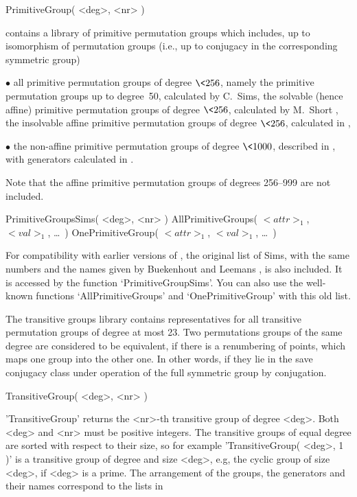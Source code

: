 
\>PrimitiveGroup( <deg>, <nr> )

{\GAP} contains a library of primitive permutation groups which includes,
up to  isomorphism of permutation groups   (i.e., up to conjugacy  in the
corresponding symmetric group)
{\parindent\manindent
\item{$\bullet$} all   primitive permutation  groups  of  degree $\<256$,
  namely
\itemitem{$\circ$}  the  primitive permutation  groups   up to degree~50,
  calculated by C.~Sims,
\itemitem{$\circ$}  the  solvable (hence  affine)   primitive permutation
  groups of degree $\<256$, calculated by M.~Short \cite{Short92},
\itemitem{$\circ$} the insolvable affine  primitive permutation groups of
  degree $\<256$, calculated in \cite{Theissen97},
\item{$\bullet$} the non-affine primitive   permutation groups of  degree
  $\<1000$,  described   in   \cite{DixonMortimer88},  with    generators
  calculated in \cite{Theissen97}.\par}
Note that the affine primitive permutation groups of degrees 256--999 are
not included.

\>PrimitiveGroupsSims( <deg>, <nr> )
\>AllPrimitiveGroups( $<attr>_1$, $<val>_1$, \dots\ )
\>OnePrimitiveGroup( $<attr>_1$, $<val>_1$, \dots\ )

For compatibility  with earlier versions  of {\GAP}, the original list of
Sims,  with  the same numbers  and  the  names  given by  Buekenhout  and
Leemans \cite{BuekenhoutLeemans96},
is     also  included.   It is    accessed     by  the function
`PrimitiveGroupSims'.   You   can   also use  the    well-known functions
`AllPrimitiveGroups' and `OnePrimitiveGroup' with this old list.


The transitive groups library contains representatives for all transitive
permutation groups of degree at most  23.  Two permutations groups of the
same degree are considered to be equivalent, if there is a renumbering of
points, which maps one group into the other one.  In other words, if they
lie in the save  conjugacy class  under operation  of the  full symmetric
group by conjugation.

\>TransitiveGroup( <deg>, <nr> )

'TransitiveGroup' returns the  <nr>-th transitive group of  degree <deg>.
Both <deg> and <nr> must be positive integers.   The transitive groups of
equal  degree are  sorted with  respect  to  their  size, so for  example
'TransitiveGroup( <deg>, 1 )' is a transitive group of degree and size
<deg>, e.g, the cyclic group  of size <deg>, if <deg>   is a prime.  
The arrangement of the groups, the generators and their names correspond
to the lists in \cite{ConwayHulpkeMcKay97}

